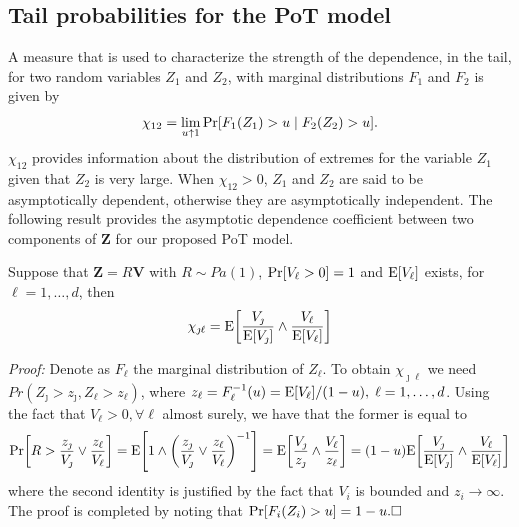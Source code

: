 \subsection{Tail probabilities for the PoT model}

A measure that is used to characterize the strength of the dependence,
  in the tail, for two random variables $Z_1$ and $Z_2$, with marginal
  distributions $F_1$ and $F_2$ is given by \citep{coles2001}
  \[
    \chi_{12} = \lim\limits_{u\uparrow 1} \prob{F_1(Z_1)>u\mid F_2(Z_2)>u}.   
  \]
  $\chi_{12}$ provides information about the distribution of extremes for the variable $Z_1$
  given that $Z_2$ is very large.  When $\chi_{12}>0$, $Z_1$ and $Z_2$ are said to
  be asymptotically dependent, otherwise they are asymptotically independent. The following result 
  provides the asymptotic dependence coefficient between two components of $\bm{Z}$
  for our proposed PoT model.
  \begin{prop}\label{ppchi}
  Suppose that $\bm{Z} = R\bm{V}$ with $R\sim Pa(1)$,
  $\prob{V_\ell > 0} = 1$ and $\expect{V_\ell}$ exists, for $\ell=1, \ldots ,d$, then
    \begin{equation}
    \label{eqn:chi_ij}
	\chi_{\jmath\ell} = \expect{\frac{V_\jmath}{\expect{V_\jmath}} \wedge \frac{V_\ell}{\expect{V_\ell}}}
    \end{equation}
  \end{prop}
  {\em Proof:}
  Denote as $F_\ell$ the marginal distribution of $Z_\ell$. To obtain $\chi_{\jmath\ell}$ we need 
  $Pr(Z_\jmath>z_\jmath,Z_\ell>z_\ell)$, where $z_\ell = F_\ell^{-1}(u) = \expect{V_\ell}/(1 - u), \;\ell=1,\dots, d$.  
  Using the fact that $V_\ell>0, \forall \ell$ almost surely, we have that the former is equal to
   \[ 
    \prob{R>\frac{z_\jmath}{V_\jmath}\vee\frac{z_\ell}{V_\ell}}
    = \expect{1\wedge\left(\frac{z_\jmath}{V_\jmath}\vee\frac{z_\ell}{V_\ell}\right)^{-1}}
    = \expect{\frac{V_\jmath}{z_\jmath}\wedge\frac{V_\ell}{z_\ell}}
    = (1 - u)\expect{\frac{V_\jmath}{\expect{V_\jmath}}\wedge\frac{V_\ell}{\expect{V_\ell}}}
    \]
  where the second identity is justified by the fact that $V_i$ is bounded and $z_i\rightarrow\infty$. The 
  proof is completed by noting that $\prob{F_i(Z_i)>u} = 1 - u. \hfill\Box$


